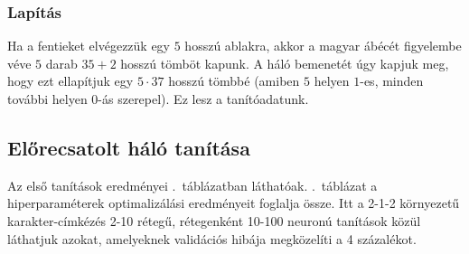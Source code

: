 \documentclass[a4paper, magyar]{article}
\begin{document}
\subsubsection{Lapítás}

Ha a fentieket elvégezzük egy $5$ hosszú ablakra, akkor a magyar ábécét figyelembe véve $5$ darab $35+2$ hosszú tömböt kapunk. A háló bemenetét úgy kapjuk meg, hogy ezt ellapítjuk egy $5\cdot37$ hosszú tömbbé (amiben $5$ helyen $1$-es, minden további helyen $0$-ás szerepel). Ez lesz a tanítóadatunk.
\subsection{Előrecsatolt háló tanítása}
Az első tanítások eredményei .~táblázatban láthatóak. .~táblázat a hiperparaméterek optimalizálási eredményeit foglalja össze. Itt a 2-1-2 környezetű karakter-címkézés 2-10 rétegű, rétegenként 10-100 neuronú tanítások közül láthatjuk azokat, amelyeknek validációs hibája megközelíti a 4 százalékot.
\end{document}
